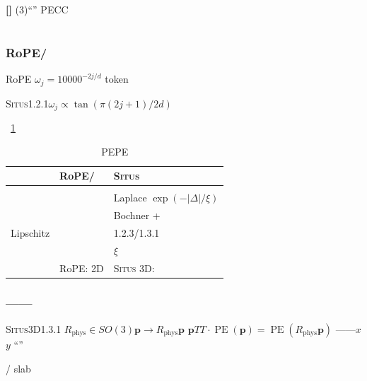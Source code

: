 \documentclass[11pt,a4paper]{article}
\theoremstyle{remark}
\DeclareMathOperator{\PE}{PE}
\newcommand{\Situs}{\textsc{Situs}}
\newcommand{\heuristic}{\textnormal{\textbf{[]}}}
\begin{document}
\heuristic{} (3)``''
PECC

\section{}

\subsection{}

\subsubsection{RoPE/}

RoPE\cite{su2024roformer}\cite{vaswani2017attention}
\textbf{}$\omega_j = 10000^{-2j/d}$
token

\Situs{}1.2.1$\omega_j \propto \tan(\pi(2j+1)/2d)$

~\ref{tab:comparison}

\begin{table}[htbp]
\centering
\caption{PEPE}
\label{tab:comparison}
\begin{tabular}{@{}p{3.5cm}ll@{}}
\toprule
\textbf{} & \textbf{RoPE/} & \textbf{\Situs{}} \\
\midrule
 &  &  \\
 &  & Laplace $\exp(-|\Delta|/\xi)$ \\
 &  & Bochner +  \\
Lipschitz &  & 1.2.3/1.3.1 \\
 &  & $\xi$ \\
 & RoPE: 2D & \Situs{} 3D: \textbf{} \\
\bottomrule
\end{tabular}
\end{table}

\subsubsection{——}

\Situs{}3D1.3.1\textbf{}
$R_{\text{phys}} \in SO(3)$$\mathbf{p} \to R_{\text{phys}}\mathbf{p}$
$\mathbf{p}$$T$$T \cdot \PE(\mathbf{p}) = \PE(R_{\text{phys}}\mathbf{p})$
——$x$$y$
``''

/
slab
\end{document}
